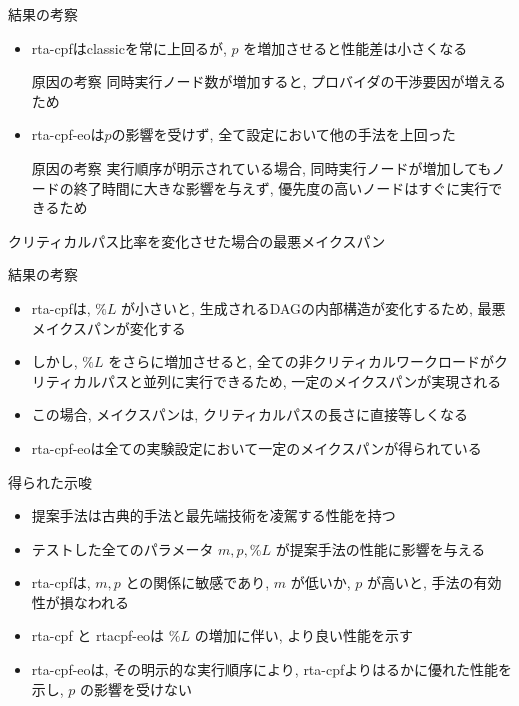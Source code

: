 \begin{frame}{結果の考察}
    \begin{itemize}
        \item rta-cpfはclassicを常に上回るが, $p$ を増加させると性能差は小さくなる
              \begin{block}{原因の考察}
                  同時実行ノード数が増加すると, プロバイダの干渉要因が増えるため
              \end{block}
              \vspace{5mm}
        \item rta-cpf-eoは$p$の影響を受けず, 全て設定において他の手法を上回った
              \begin{block}{原因の考察}
                  実行順序が明示されている場合, 同時実行ノードが増加してもノードの終了時間に大きな影響を与えず, 優先度の高いノードはすぐに実行できるため
              \end{block}
    \end{itemize}
\end{frame}

\begin{frame}{クリティカルパス比率を変化させた場合の最悪メイクスパン}
\end{frame}

\begin{frame}{結果の考察}
    \begin{itemize}
        \item rta-cpfは, $\% L$ が小さいと, 生成されるDAGの内部構造が変化するため, 最悪メイクスパンが変化する
        \item しかし, $\% L$ をさらに増加させると, 全ての非クリティカルワークロードがクリティカルパスと並列に実行できるため, 一定のメイクスパンが実現される
        \item この場合, メイクスパンは, クリティカルパスの長さに直接等しくなる
        \item rta-cpf-eoは全ての実験設定において一定のメイクスパンが得られている
    \end{itemize}
\end{frame}

\begin{frame}{得られた示唆}
    \begin{itemize}
        \item 提案手法は古典的手法と最先端技術を凌駕する性能を持つ
        \item テストした全てのパラメータ $m, p, \% L$ が提案手法の性能に影響を与える
        \item rta-cpfは, $m, p$ との関係に敏感であり, $m$ が低いか, $p$ が高いと, 手法の有効性が損なわれる
        \item rta-cpf と rtacpf-eoは $\% L$ の増加に伴い, より良い性能を示す
        \item rta-cpf-eoは, その明示的な実行順序により, rta-cpfよりはるかに優れた性能を示し, $p$ の影響を受けない
    \end{itemize}
\end{frame}



